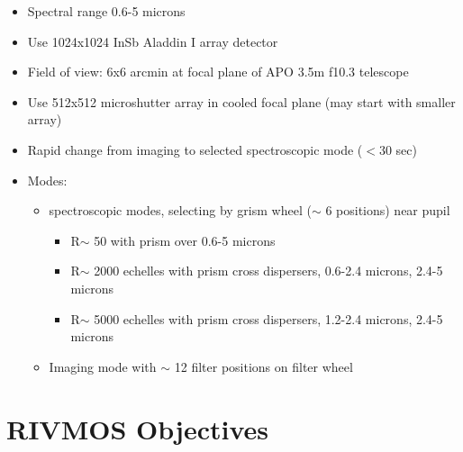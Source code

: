 \documentclass{article}
\begin{document}
\begin{itemize}
\item Spectral range 0.6-5 microns
\item Use 1024x1024 InSb Aladdin I array detector
\item Field of view: 6x6 arcmin at focal plane of APO 3.5m f10.3 telescope
\item Use 512x512 microshutter array in cooled focal plane (may start with
smaller array)
\item Rapid change from imaging to selected spectroscopic mode ($<$30 sec)
\item Modes: 
  \begin{itemize}
  \item spectroscopic modes, selecting by grism wheel ($\sim$ 6 positions)
  near pupil
   \begin{itemize}
    \item R$\sim$ 50 with prism over 0.6-5 microns
    \item R$\sim$ 2000 echelles with prism cross dispersers, 0.6-2.4 microns,
      2.4-5 microns
    \item R$\sim$ 5000 echelles with prism cross dispersers, 1.2-2.4 microns,
      2.4-5 microns
   \end{itemize}
 \item Imaging mode with $\sim$ 12 filter positions on filter wheel
 \end{itemize}
\end{itemize}

\section{RIVMOS Objectives}
\end{document}
